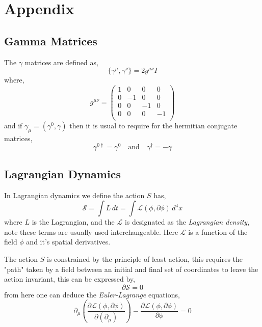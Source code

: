 
\newpage 

\section{Appendix}

\subsection{Gamma Matrices}
The $\gamma$ matrices are defined as, 
\begin{equation}
\{  \gamma^\mu , \gamma^\nu \} = 2 g^{\mu \nu} I 
\end{equation}
where, 
\begin{equation}
g^{ \mu \nu } = 
\begin{pmatrix}
1 & 0 & 0 & 0 \\
0 & -1 & 0 & 0  \\
0 & 0 & -1 & 0 \\
0 & 0 & 0 & -1 \\
\end{pmatrix}
\end{equation}
and if $\gamma_\mu = (\gamma^0, \gamma)$  then it is usual to require for the hermitian conjugate matrices,
\begin{equation}
\gamma^{0 \dagger} = \gamma^0 \quad \textrm{and} \quad \gamma^\dagger = - \gamma 
\end{equation}


\subsection{Lagrangian Dynamics}

In Lagrangian dynamics we define the action $S$ has, 
\begin{equation}
\mathcal{S} = \int L \, dt = \int \mathcal{L}(\phi,\partial \phi ) \, d^4x  
\end{equation}
where $L$ is the Lagrangian, and the $\mathcal{L}$ is designated as the \textit{Lagrangian density}, note these terms are
usually used interchangeable. Here $\mathcal{L}$ is a function of the field $\phi$ and it's spatial derivatives. 

The action $S$ is constrained by the principle of least action, this requires the "path" taken by a field between an initial and final set
of coordinates to leave the action invariant, this can be expressed by,
\begin{equation}
\partial \mathcal{S} = 0 
\end{equation}
from here one can deduce the \textit{Euler-Lagrange} equations,
\begin{equation}
\partial_\mu \left( \frac{\partial \mathcal{L}(\phi,\partial \phi ) }{ \partial (\partial_\mu) } \right) - \frac{ \partial \mathcal{L}(\phi,\partial \phi ) }{ \partial \phi }  = 0 
\end{equation} 
